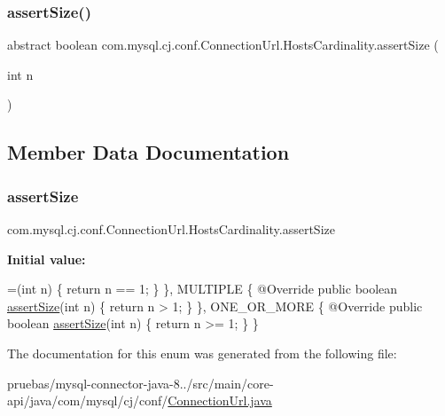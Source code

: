 \subsubsection{\texorpdfstring{assert\+Size()}{assertSize()}}
{\footnotesize\ttfamily abstract boolean com.\+mysql.\+cj.\+conf.\+Connection\+Url.\+Hosts\+Cardinality.\+assert\+Size (\begin{DoxyParamCaption}\item[{int}]{n }\end{DoxyParamCaption})\hspace{0.3cm}{\ttfamily [abstract]}}



\subsection{Member Data Documentation}
\mbox{\label{enumcom_1_1mysql_1_1cj_1_1conf_1_1_connection_url_1_1_hosts_cardinality_a841d1e01689174a7e5f02fe698ccbd5f}} 
\subsubsection{\texorpdfstring{assert\+Size}{assertSize}}
{\footnotesize\ttfamily com.\+mysql.\+cj.\+conf.\+Connection\+Url.\+Hosts\+Cardinality.\+assert\+Size}

{\bfseries Initial value\+:}
\begin{DoxyCode}
=(\textcolor{keywordtype}{int} n) \{
                \textcolor{keywordflow}{return} n == 1;
            \}
        \},
        MULTIPLE \{
            @Override
            \textcolor{keyword}{public} \textcolor{keywordtype}{boolean} \mbox{\hyperlink{enumcom_1_1mysql_1_1cj_1_1conf_1_1_connection_url_1_1_hosts_cardinality_a841d1e01689174a7e5f02fe698ccbd5f}{assertSize}}(\textcolor{keywordtype}{int} n) \{
                \textcolor{keywordflow}{return} n > 1;
            \}
        \},
        ONE\_OR\_MORE \{
            @Override
            \textcolor{keyword}{public} \textcolor{keywordtype}{boolean} \mbox{\hyperlink{enumcom_1_1mysql_1_1cj_1_1conf_1_1_connection_url_1_1_hosts_cardinality_a841d1e01689174a7e5f02fe698ccbd5f}{assertSize}}(\textcolor{keywordtype}{int} n) \{
                \textcolor{keywordflow}{return} n >= 1;
            \}
        \}
\end{DoxyCode}


The documentation for this enum was generated from the following file\+:\begin{DoxyCompactItemize}
\item 
pruebas/mysql-\/connector-\/java-\/8../src/main/core-\/api/java/com/mysql/cj/conf/\mbox{\hyperlink{_connection_url_8java}{Connection\+Url.\+java}}\end{DoxyCompactItemize}
